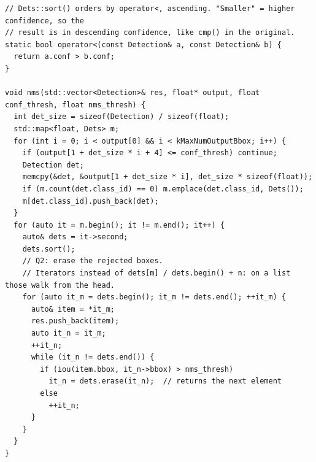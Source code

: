 \documentclass[11pt,a4paper]{article}
\begin{document}
\begin{lstlisting}[caption={Η \texttt{nms()} πάνω στη βιβλιοθήκη DDTR (Ζητούμενο 2). Ο κώδικας είναι αυτός που μετρήθηκε, το τμήμα \texttt{\#ifdef NMS\_FLAG} του Ζητουμένου 4 παραλείπεται εδώ.}, label={lst:q2}]
// Dets::sort() orders by operator<, ascending. "Smaller" = higher confidence, so the
// result is in descending confidence, like cmp() in the original.
static bool operator<(const Detection& a, const Detection& b) {
  return a.conf > b.conf;
}

void nms(std::vector<Detection>& res, float* output, float conf_thresh, float nms_thresh) {
  int det_size = sizeof(Detection) / sizeof(float);
  std::map<float, Dets> m;
  for (int i = 0; i < output[0] && i < kMaxNumOutputBbox; i++) {
    if (output[1 + det_size * i + 4] <= conf_thresh) continue;
    Detection det;
    memcpy(&det, &output[1 + det_size * i], det_size * sizeof(float));
    if (m.count(det.class_id) == 0) m.emplace(det.class_id, Dets());
    m[det.class_id].push_back(det);
  }
  for (auto it = m.begin(); it != m.end(); it++) {
    auto& dets = it->second;
    dets.sort();
    // Q2: erase the rejected boxes.
    // Iterators instead of dets[m] / dets.begin() + n: on a list those walk from the head.
    for (auto it_m = dets.begin(); it_m != dets.end(); ++it_m) {
      auto& item = *it_m;
      res.push_back(item);
      auto it_n = it_m;
      ++it_n;
      while (it_n != dets.end()) {
        if (iou(item.bbox, it_n->bbox) > nms_thresh)
          it_n = dets.erase(it_n);  // returns the next element
        else
          ++it_n;
      }
    }
  }
}
\end{lstlisting}
\end{document}
